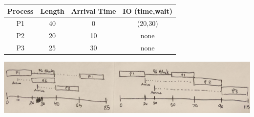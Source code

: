 \documentclass[12pt]{article}
\begin{document}
\begin{enumerate}
		\begin{center}
			\begin{tabular}{ |c|c|c|c| } 
				\hline
				Process & Length & Arrival Time & IO (time,wait) \\ 
				\hline\hline
				P1 & 40 & 0 & (20,30) \\ 
				\hline
				P2 & 20 & 10 & none \\
				\hline
				P3 & 25 & 30 & none \\
				\hline
			\end{tabular}
			\includegraphics[width=\textwidth]{IMG_0334.jpg}
		\end{center}
\end{enumerate}
\end{document}
